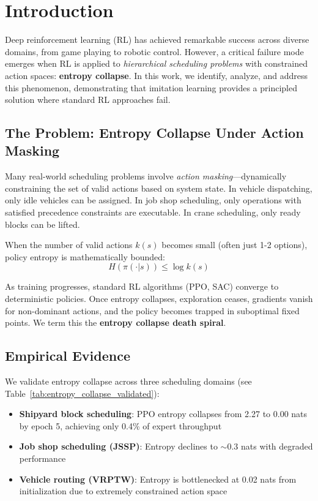 \documentclass[11pt,a4paper]{article}
\begin{document}
\section{Introduction}
\label{sec:introduction}

Deep reinforcement learning (RL) has achieved remarkable success across diverse domains, from game playing to robotic control. However, a critical failure mode emerges when RL is applied to \textit{hierarchical scheduling problems} with constrained action spaces: \textbf{entropy collapse}. In this work, we identify, analyze, and address this phenomenon, demonstrating that imitation learning provides a principled solution where standard RL approaches fail.

\subsection{The Problem: Entropy Collapse Under Action Masking}

Many real-world scheduling problems involve \textit{action masking}---dynamically constraining the set of valid actions based on system state. In vehicle dispatching, only idle vehicles can be assigned. In job shop scheduling, only operations with satisfied precedence constraints are executable. In crane scheduling, only ready blocks can be lifted.

When the number of valid actions $k(s)$ becomes small (often just 1-2 options), policy entropy is mathematically bounded:
\begin{equation}
H(\pi(\cdot|s)) \leq \log k(s)
\end{equation}

As training progresses, standard RL algorithms (PPO, SAC) converge to deterministic policies. Once entropy collapses, exploration ceases, gradients vanish for non-dominant actions, and the policy becomes trapped in suboptimal fixed points. We term this the \textbf{entropy collapse death spiral}.

\subsection{Empirical Evidence}

We validate entropy collapse across three scheduling domains (see Table~\ref{tab:entropy_collapse_validated}):

\begin{itemize}
    \item \textbf{Shipyard block scheduling}: PPO entropy collapses from 2.27 to 0.00 nats by epoch 5, achieving only 0.4\% of expert throughput
    \item \textbf{Job shop scheduling (JSSP)}: Entropy declines to $\sim$0.3 nats with degraded performance
    \item \textbf{Vehicle routing (VRPTW)}: Entropy is bottlenecked at 0.02 nats from initialization due to extremely constrained action space
\end{itemize}
\end{document}
